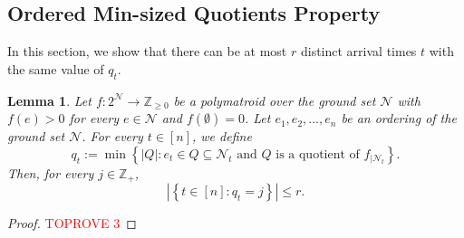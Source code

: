 \documentclass[11pt]{article}
\newtheorem{lemma}{Lemma}
\theoremstyle{definition}
\newcommand{\calN}{{\mathcal{N}}}
\newcommand{\knote}[1]{{\bf{\color{blue}[\tiny Karthik: #1]}}}
\newcommand{\Z}{\mathbb{Z}}
\begin{document}
\subsection{Ordered Min-sized Quotients Property}\label{subsection:property-quotient}


In this section, we show that there can be at most $r$ distinct arrival times $t$ with the same value of $q_t$.

\begin{lemma}\label{lemma:counting-quotient}
Let $f: 2^{\calN}\rightarrow \Z_{\ge 0}$ be a polymatroid over the ground set $\calN$ with $f(e)>0$ for every $e\in \mathcal{N}$ and $f(\emptyset)=0$. Let $e_1, e_2, \ldots, e_n$ be an ordering of the ground set $\calN$. For every $t\in [n]$, we define
\[
q_t:=\min\left\{|Q|: e_t\in Q\subseteq \calN_t \text{ and $Q$ is a quotient of $f_{|\calN_t}$}\right\}. 
\]
Then, for every $j\in \Z_+$,
\[
|\left\{t\in [n]: q_t = j\right\}| \le r.
\]

\iffalse
    \knote{This lemma is crucial and seems interesting by itself. I would prefer to state it completely with all hypothesis.}
\knote{
Let $f: 2^{\calN}\rightarrow \Z_{\ge 0}$ be a polymatroid over the ground set $\calN$ and let $e_1, e_2, \ldots, e_n$ be an ordering of the ground set $\calN$. Let 
\[
q_t:=\min\left\{|Q|: e_t\in Q\subseteq \calN_t \ \& \ \text{$Q$ is a quotient of $f_{|\calN_t}$}\right\} \ \forall t\in [n]. 
\]
Then, 
\[
|\left\{t\in [n]: q_t = j\right\}| \le r\ \forall\ j\in [n].
\]
}
\fi

\end{lemma}
\begin{proof}\textcolor{red}{TOPROVE 3}\end{proof}
\end{document}
